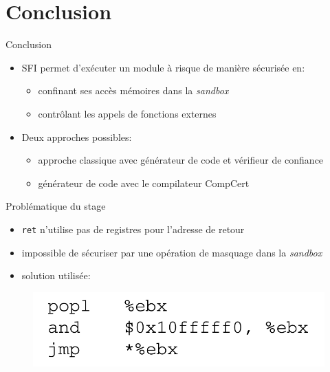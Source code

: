\documentclass[10pt,usenames,dvipsnames]{beamer}
\begin{document}
\section{Conclusion}

\begin{frame}{Conclusion}
	\begin{itemize}
		\item SFI permet d'exécuter un module à risque de manière sécurisée en:
		\begin{itemize}
			\item confinant ses accès mémoires dans la \textit{sandbox}
			\item contrôlant les appels de fonctions externes
		\end{itemize}
		\item Deux approches possibles:
		\begin{itemize}
			\item approche classique avec générateur de code et vérifieur de confiance
			\item générateur de code avec le compilateur CompCert
		\end{itemize}
	\end{itemize}
\end{frame}

\begin{frame}{Problématique du stage}
	\begin{itemize}
		\item \texttt{ret} n'utilise pas de registres pour l'adresse de retour	
		\item impossible de sécuriser par une opération de masquage dans la \textit{sandbox}
		\item solution utilisée:
	\end{itemize}
	\begin{figure}
		\centering
		\includegraphics[scale=0.17]{ret_pop.png}	
	\end{figure}
\end{frame}
\end{document}
